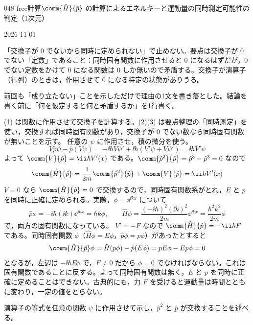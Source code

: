\documentclass[uplatex,dvipdfmx,a4paper,11pt]{jsarticle}
\begin{document}
\begin{mondai}{048-free}{計算}{$\comm{\hat{H}}{\hat{p}}$ の計算によるエネルギーと運動量の同時測定可能性の判定（1次元）}
\begin{kotaeutsushi}{2026-11-01}
\end{kotaeutsushi}
\begin{kizuki}
\item 「交換子が $0$ でないから同時に定められない」で止めない。要点は交換子が $0$ でない「定数」であること：同時固有関数に作用させると $0$ になるはずだが，$0$ でない定数をかけて $0$ になる関数は $0$ しか無いので矛盾する。交換子が演算子（行列）のときは，作用させて $0$ になる特定の状態がありうる。
\item {} 前回も「成り立たない」ことを示しただけで理由の1文を書き落とした。結論を書く前に「何を仮定すると何と矛盾するか」を1行書く。
\end{kizuki}
\begin{tadashii}
\houshin (1) は関数に作用させて交換子を計算する。(2)(3) は要点整理の「同時測定」を使い，交換すれば同時固有関数があり，交換子が $0$ でない数なら同時固有関数が無いことを示す。
\keisan {} 任意の $\psi$ に作用させ，積の微分を使う。
\[ V\hat{p}\psi-\hat{p}(V\psi)=-\ii\hbar V\psi'+\ii\hbar\left(V'\psi+V\psi'\right)=\ii\hbar V'\psi \]
よって $\comm{V}{\hat{p}}=\ii\hbar V'(x)$ である。$\comm{\hat{p}^{2}}{\hat{p}}=\hat{p}^{3}-\hat{p}^{3}=0$ なので
\[ \comm{\hat{H}}{\hat{p}}=\frac{1}{2m}\comm{\hat{p}^{2}}{\hat{p}}+\comm{V}{\hat{p}}=\ii\hbar V'(x) \]
 $V=0$ なら $\comm{\hat{H}}{\hat{p}}=0$ で交換するので，同時固有関数系がとれ，$E$ と $p$ を同時に正確に定められる。実際，$\phi=\ee^{\ii kx}$ について
\[ \hat{p}\phi=-\ii\hbar(\ii k)\ee^{\ii kx}=\hbar k\phi,\qquad \hat{H}\phi=\frac{(-\ii\hbar)^{2}(\ii k)^{2}}{2m}\ee^{\ii kx}=\frac{\hbar^{2}k^{2}}{2m}\phi \]
で，両方の固有関数になっている。
 $V'=-F$ なので $\comm{\hat{H}}{\hat{p}}=-\ii\hbar F$ である。同時固有関数 $\phi$（$\hat{H}\phi=E\phi$，$\hat{p}\phi=p\phi$）があったとすると
\[ \comm{\hat{H}}{\hat{p}}\phi=\hat{H}(p\phi)-\hat{p}(E\phi)=pE\phi-Ep\phi=0 \]
となるが，左辺は $-\ii\hbar F\phi$ で，$F\ne 0$ だから $\phi=0$ でなければならない。これは固有関数であることに反する。よって同時固有関数は無く，$E$ と $p$ を同時に正確に定めることはできない。古典的にも，力 $F$ を受けると運動量は時間とともに変わり，一定の値をとらない。
\begin{ronten}
  \item {} 演算子の等式を任意の関数 $\psi$ に作用させて示し，$\hat{p}^{2}$ と $\hat{p}$ が交換することを述べる。

\end{ronten}
\end{tadashii}
\end{mondai}
\end{document}
